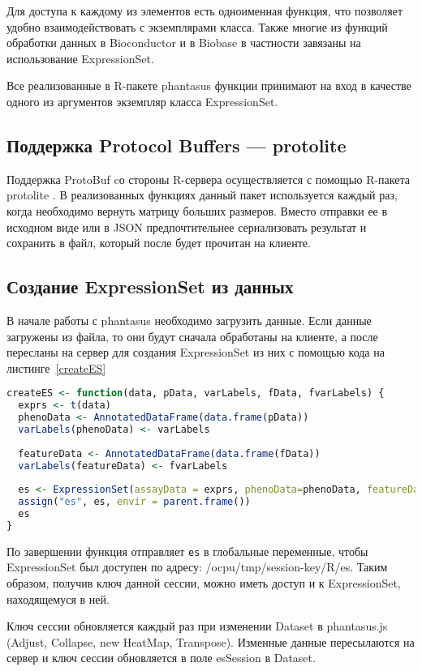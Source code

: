 \documentclass[annotation,specification]{itmo-student-thesis}
\begin{document}
Для доступа к каждому из элементов есть одноименная функция, что позволяет удобно взаимодействовать с экземплярами класса. Также многие из функций обработки данных в Bioconductor и в Biobase в частности завязаны на использование ExpressionSet.

Все реализованные в R-пакете phantasus функции принимают на вход в качестве одного из аргументов экземпляр класса ExpressionSet.

\subsection{Поддержка Protocol Buffers --- protolite}
Поддержка ProtoBuf cо стороны R-сервера осуществляется с помощью R-пакета protolite \cite{protolite}. В реализованных функциях данный пакет используется каждый раз, когда необходимо вернуть матрицу больших размеров. Вместо отправки ее в исходном виде или в JSON предпочтительнее сериализовать результат и сохранить в файл, который после будет прочитан на клиенте.

\subsection{Создание ExpressionSet из данных}
В начале работы с phantasus необходимо загрузить данные. Если данные загружены из файла, то они будут сначала обработаны на клиенте, а после пересланы на сервер для создания ExpressionSet из них с помощью кода на листинге~\ref{createES}

\begin{lstlisting}[float=!h,caption={Функция создания ExpressionSet из исходных данных},label={createES},language=R]
createES <- function(data, pData, varLabels, fData, fvarLabels) {
  exprs <- t(data)
  phenoData <- AnnotatedDataFrame(data.frame(pData))
  varLabels(phenoData) <- varLabels
  
  featureData <- AnnotatedDataFrame(data.frame(fData))
  varLabels(featureData) <- fvarLabels
 
  es <- ExpressionSet(assayData = exprs, phenoData=phenoData, featureData = featureData)
  assign("es", es, envir = parent.frame())
  es
}
\end{lstlisting}

По завершении функция отправляет \texttt{es} в глобальные переменные, чтобы ExpressionSet был доступен по адресу: /ocpu/tmp/session-key/R/es. Таким образом, получив ключ данной сессии, можно иметь доступ и к ExpressionSet, находящемуся в ней.

Ключ сессии обновляется каждый раз при изменении Dataset в phantasus.js (Adjust, Collapse, new HeatMap, Transpose). Изменные данные пересылаются на сервер и ключ сессии обновляется в поле esSession в Dataset.
\end{document}
